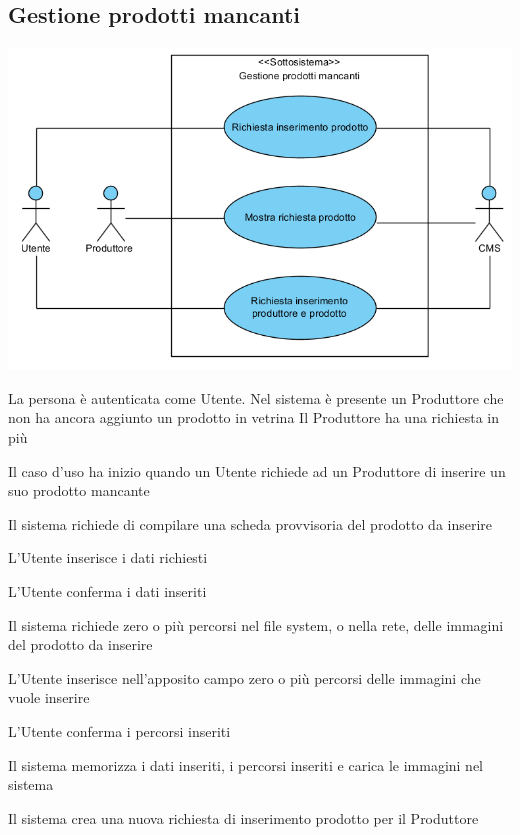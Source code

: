 \subsection{Gestione prodotti mancanti}
\begin{center}
   \includegraphics[width=\textwidth]{assets/visualParadigm/GestioneProdottiMancanti}
\end{center}
{}
{La persona è autenticata come Utente. Nel sistema è presente un Produttore che non ha ancora aggiunto un prodotto in vetrina}
{Il Produttore ha una richiesta in più}
{\begin{enumCU}
		\item Il caso d'uso ha inizio quando un Utente richiede ad un Produttore di inserire un suo prodotto mancante
		\item Il sistema richiede di compilare una scheda provvisoria del prodotto da inserire
		\item L'Utente inserisce i dati richiesti \label{curicinsimmpro:1}
		\item L'Utente conferma i dati inseriti 
		\item Il sistema richiede zero o più percorsi nel file system, o nella rete, delle immagini del prodotto da inserire
		\item L'Utente inserisce nell'apposito campo zero o più percorsi delle immagini che vuole inserire \label{curicinsimmpro:2}
		\item L'Utente conferma i percorsi inseriti \label{curicinsimmpro:3}
		\item Il sistema memorizza i dati inseriti, i percorsi inseriti e carica le immagini nel sistema
		\item Il sistema crea una nuova richiesta di inserimento prodotto per il Produttore
	\end{enumCU}}
